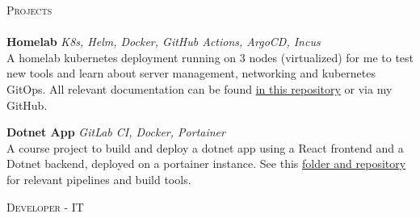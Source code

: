 \documentclass[a4paper]{article}
\newcommand{\lineunder} {
    \vspace*{-8pt} \\
    \hspace*{-18pt} \hrulefill \\
}
\newcommand{\header} [1] {
    {\hspace*{-18pt}\vspace*{6pt} \textsc{#1}}
    \vspace*{-6pt} \lineunder
}
\begin{document}
\header{Projects}
{\textbf{Homelab}} {\sl K8s, Helm, Docker, GitHub Actions, ArgoCD, Incus} \\
A homelab kubernetes deployment running on 3 nodes (virtualized) for me to test new tools and learn about server management, networking and kubernetes GitOps. All relevant documentation can be found \href{https://github.com/pontusc/homelab}{in this repository} or via my GitHub.\\
\vspace{4mm}

{\textbf{Dotnet App}} {\sl GitLab CI, Docker, Portainer} \\
A course project to build and deploy a dotnet app using a React frontend and a Dotnet backend, deployed on a portainer instance. See this \href{https://github.com/pontusc/devops-doe24/tree/main/pipeline-utilities}{folder and repository} for relevant pipelines and build tools.\\
\vspace{8mm}

\header{Developer - IT}
\vspace{4mm}
\end{document}
